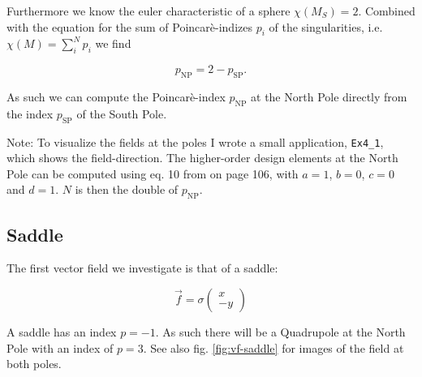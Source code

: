 \documentclass[a4paper,10pt,notitlepage]{scrartcl}
\begin{document}
Furthermore we know the euler characteristic of a sphere $\chi(M_S) = 2$.
Combined with the equation for the sum of Poincar\`e-indizes $p_i$ of the
singularities, i.e. $\chi(M) = \sum_i^N p_i$ we find

\begin{equation}
  p_{\text{NP}} = 2 - p_{\text{SP}}.
\end{equation}

As such we can compute the Poincar\`e-index $p_{\text{NP}}$ at the North Pole
directly from the index $p_{\text{SP}}$ of the South Pole.

Note: To visualize the fields at the poles I wrote a small application,
\texttt{Ex4\_1}, which shows the field-direction. The higher-order design
elements at the North Pole can be computed using eq. 10 from \cite{tfd} on page
106, with $a = 1$, $b = 0$, $c = 0$ and $d = 1$. $N$ is then the double of
$p_{\text{NP}}$.

\subsection{Saddle}

The first vector field we investigate is that of a saddle:

\begin{equation}
 \vec{f} = \sigma \left( \begin{array}{c}
                   x \\ -y
                  \end{array} \right)
 \label{eq:vf-saddle}
\end{equation}

A saddle has an index $p = -1$. As such there will be a Quadrupole at the North
Pole with an index of $p = 3$. See also fig. \ref{fig:vf-saddle} for images
of the field at both poles.
\end{document}

